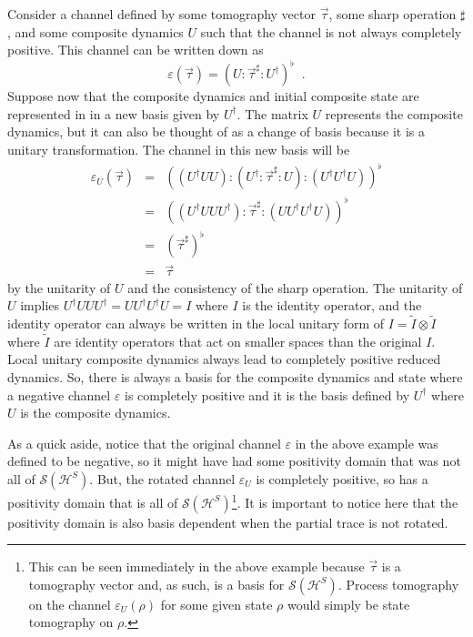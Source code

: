 Consider a channel defined by some tomography vector $\vec{\tau}$, some sharp operation $\sharp$, and some composite dynamics $U$ such that the channel is not always completely positive.  This channel can be written down as
$$
\varepsilon(\vec{\tau})=\left(U:\vec{\tau}^\sharp :U^\dagger\right)^\flat\;\;.
$$
Suppose now that the composite dynamics and initial composite state are represented in in a new basis given by $U^\dagger$.  The matrix $U$ represents the composite dynamics, but it can also be thought of as a change of basis because it is a unitary transformation.  The channel in this new basis will be
\begin{eqnarray*}
\varepsilon_U(\vec{\tau})&=&\left(\left(U^\dagger UU\right):\left(U^\dagger :\vec{\tau}^\sharp :U \right):\left(U^\dagger U^\dagger U \right)\right)^\flat\\
&=& \left(\left(U^\dagger UU U^\dagger\right):\vec{\tau}^\sharp :\left(UU^\dagger U^\dagger U \right)\right)^\flat\\
&=& \left(\vec{\tau}^\sharp \right)^\flat\\
&=& \vec{\tau}
\end{eqnarray*}
by the unitarity of $U$ and the consistency of the sharp operation.  The unitarity of $U$ implies $U^\dagger UU U^\dagger = UU^\dagger U^\dagger U = I$ where $I$ is the identity operator, and the identity operator can always be written in the local unitary form of $I=\tilde{I}\otimes\tilde{I}$ where $\tilde{I}$ are identity operators that act on smaller spaces than the original $I$.  Local unitary composite dynamics always lead to completely positive reduced dynamics.  So, there is always a basis for the composite dynamics and state where a negative channel $\varepsilon$ is completely positive and it is the basis defined by $U^\dagger$ where $U$ is the composite dynamics.  

As a quick aside, notice that the original channel $\varepsilon$ in the above example was defined to be negative, so it might have had some positivity domain that was not all of $\mathcal{S}(\mathcal{H}^S)$.  But, the rotated channel $\varepsilon_U$ is completely positive, so has a positivity domain that is all of $\mathcal{S}(\mathcal{H}^S)$\footnote{This can be seen immediately in the above example because $\vec{\tau}$ is a tomography vector and, as such, is a basis for $\mathcal{S}(\mathcal{H}^S)$.  Process tomography on the channel $\varepsilon_U(\rho)$ for some given state $\rho$ would simply be state tomography on $\rho$.}.  It is important to notice here that the positivity domain is also basis dependent when the partial trace is not rotated.

